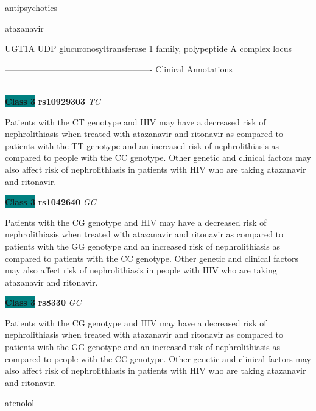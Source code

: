 \documentclass{resume} %
\begin{document}
\begin{rSection}{ antipsychotics }
\end{rSection}\begin{rSection}{ atazanavir }
\item[]

\begin{rSubsection}{ UGT1A }{ UDP glucuronosyltransferase 1 family, polypeptide A complex locus }{}{}
\item[]

\item[] ---------------------------------------------------- Clinical Annotations -----------------------------------------------------\newline
\item \textbf{\colorbox{teal} {Class 3}} \textbf{ rs10929303 } \textit{ TC }
\item[] Patients with the CT genotype and HIV may have a decreased risk of nephrolithiasis when treated with atazanavir and ritonavir as compared to patients with the TT genotype and an increased risk of nephrolithiasis as compared to people with the CC genotype. Other genetic and clinical factors may also affect risk of nephrolithiasis in patients with HIV who are taking atazanavir and ritonavir. \item \textbf{\colorbox{teal} {Class 3}} \textbf{ rs1042640 } \textit{ GC }
\item[] Patients with the CG genotype and HIV may have a decreased risk of nephrolithiasis when treated with atazanavir and ritonavir as compared to patients with the GG genotype and an increased risk of nephrolithiasis as compared to patients with the CC genotype. Other genetic and clinical factors may also affect risk of nephrolithiasis in people with HIV who are taking atazanavir and ritonavir.\item \textbf{\colorbox{teal} {Class 3}} \textbf{ rs8330 } \textit{ GC }
\item[] Patients with the CG genotype and HIV may have a decreased risk of nephrolithiasis when treated with atazanavir and ritonavir as compared to patients with the GG genotype and an increased risk of nephrolithiasis as compared to people with the CC genotype. Other genetic and clinical factors may also affect risk of nephrolithiasis in patients with HIV who are taking atazanavir and ritonavir.
\end{rSubsection}

\end{rSection}\begin{rSection}{ atenolol }
\item[]


\end{rSection}
\end{document}
